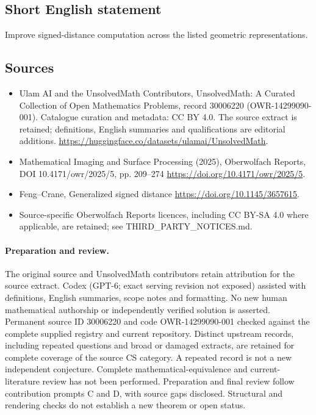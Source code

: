\documentclass[11pt]{article}
\begin{document}
\subsection{Short English statement}
Improve signed-distance computation across the listed geometric representations.
\subsection{Sources}
\begin{itemize}
\item[\hypertarget{source:30006220:1}{S1}] Ulam AI and the UnsolvedMath Contributors, UnsolvedMath: A Curated Collection of Open Mathematics Problems, record 30006220 (OWR-14299090-001). Catalogue curation and metadata: CC BY 4.0. The source extract is retained; definitions, English summaries and qualifications are editorial additions.
\url{https://huggingface.co/datasets/ulamai/UnsolvedMath}.
\item[\hypertarget{source:30006220:2}{S2}] Mathematical Imaging and Surface Processing (2025), Oberwolfach Reports, DOI 10.4171/owr/2025/5, pp. 209--274
\url{https://doi.org/10.4171/owr/2025/5}.
\item[\hypertarget{source:30006220:3}{S3}] Feng--Crane, Generalized signed distance
\url{https://doi.org/10.1145/3657615}.
\item Source-specific Oberwolfach Reports licences, including CC BY-SA 4.0 where applicable, are retained; see THIRD\_PARTY\_NOTICES.md.
\end{itemize}
\paragraph{Preparation and review.}
The original source and UnsolvedMath contributors retain attribution for the source extract. Codex (GPT-6; exact serving revision not exposed) assisted with definitions, English summaries, scope notes and formatting. No new human mathematical authorship or independently verified solution is asserted. Permanent source ID 30006220 and code OWR-14299090-001 checked against the complete supplied registry and current repository. Distinct upstream records, including repeated questions and broad or damaged extracts, are retained for complete coverage of the source CS category. A repeated record is not a new independent conjecture. Complete mathematical-equivalence and current-literature review has not been performed. Preparation and final review follow contribution prompts C and D, with source gaps disclosed. Structural and rendering checks do not establish a new theorem or open status.
\label{end:30006220}
\end{document}
